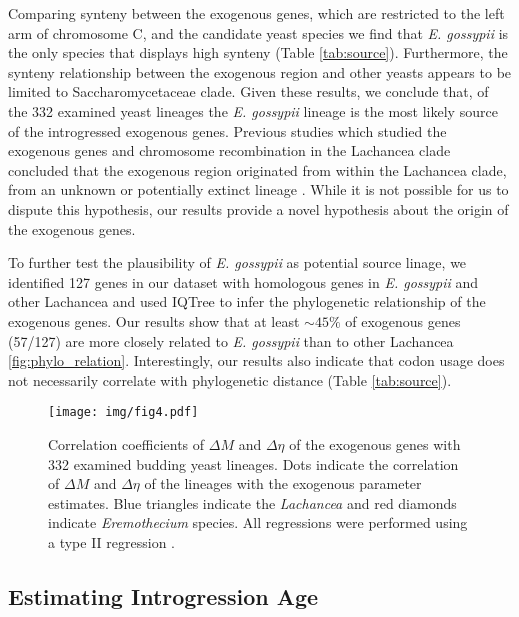 \documentclass[doublespacing,linenumbers]{bmcart-modified}
\newcommand{\gossypii}{\textit{E. gossypii}\xspace}
\newcommand{\DM}{\ensuremath{{\Delta M}}\xspace}
\newcommand{\DE}{\ensuremath{{\Delta \eta}}\xspace}
\begin{document}
Comparing synteny between the exogenous genes, which are restricted to the left arm of chromosome C, and the candidate yeast species we find that \gossypii is the only species that displays high synteny (Table \ref{tab:source}).
Furthermore, the synteny relationship between the exogenous region and other yeasts appears to be limited to Saccharomycetaceae clade.
Given these results, we conclude that, of the 332 examined yeast lineages the \gossypii lineage is the most likely source of the introgressed exogenous genes.
Previous studies which studied the exogenous genes and chromosome recombination in the Lachancea clade concluded that the exogenous region originated from within the Lachancea clade, from an unknown or potentially extinct lineage \citep{payen2009, friedrich2015, vakirlis2016}.
While it is not possible for us to dispute this hypothesis, our results provide a novel hypothesis about the origin of the exogenous genes.

To further test the plausibility of \gossypii as potential source linage, we identified 127 genes in our dataset \citep{shen2018} with homologous genes in \gossypii and other Lachancea and used IQTree \citep{nguyen2015} to infer the phylogenetic relationship of the exogenous genes. 
Our results show that at least $\sim 45 \%$ of exogenous genes (57/127) are more closely related to \gossypii than to other Lachancea \ref{fig:phylo_relation}.
Interestingly, our results also indicate that codon usage does not necessarily correlate with phylogenetic distance (Table \ref{tab:source}). 

\begin{figure}
     \centering
	\texttt{[image: img/fig4.pdf]}%
	\caption{Correlation coefficients of \DM and \DE of the exogenous genes with 332 examined budding yeast lineages. 
	Dots indicate the correlation of \DM and \DE of the lineages with the exogenous parameter estimates.
	Blue triangles indicate the \textit{Lachancea} and red diamonds indicate \textit{Eremothecium} species.
	All regressions were performed using a type II regression \citep{SokalAndRohlf1981}.}
	\label{fig:csp_exo_comp}
\end{figure}


\subsection*{Estimating Introgression Age}
\end{document}
